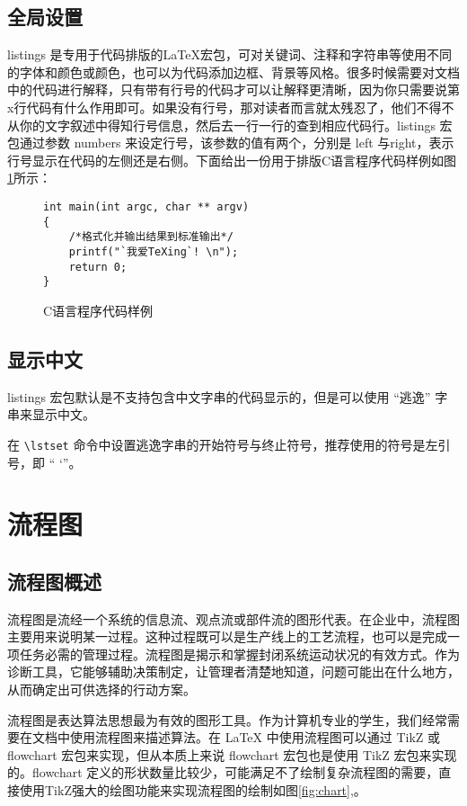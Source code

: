 \subsection{全局设置}
listings 是专用于代码排版的\LaTeX{}宏包，可对关键词、注释和字符串等使用不同的字体和颜色或颜色，也可以为代码添加边框、背景等风格。很多时候需要对文档中的代码进行解释，只有带有行号的代码才可以让解释更清晰，因为你只需要说第 x行代码有什么作用即可。如果没有行号，那对读者而言就太残忍了，他们不得不从你的文字叙述中得知行号信息，然后去一行一行的查到相应代码行。listings 宏包通过参数 numbers 来设定行号，该参数的值有两个，分别是 left 与right，表示行号显示在代码的左侧还是右侧。下面给出一份用于排版C语言程序代码样例如图\ref{fig:code}所示：
\begin{figure}[htb!]
	\centering
	\begin{lstlisting}[language={[ANSI]C}] 
int main(int argc, char ** argv) 
{ 
    /*格式化并输出结果到标准输出*/
    printf("`我爱TeXing`! \n"); 
    return 0; 
} 
	\end{lstlisting} 
	\caption{C语言程序代码样例}
	\label{fig:code}
\end{figure}

\subsection{显示中文}
listings 宏包默认是不支持包含中文字串的代码显示的，但是可以使用 “逃逸” 字串来显示中文。

在 \verb|\lstset| 命令中设置逃逸字串的开始符号与终止符号，推荐使用的符号是左引号，即 “ `”。

\section{流程图}

\subsection{流程图概述}

流程图是流经一个系统的信息流、观点流或部件流的图形代表。在企业中，流程图主要用来说明某一过程。这种过程既可以是生产线上的工艺流程，也可以是完成一项任务必需的管理过程。流程图是揭示和掌握封闭系统运动状况的有效方式。作为诊断工具，它能够辅助决策制定，让管理者清楚地知道，问题可能出在什么地方，从而确定出可供选择的行动方案。

流程图是表达算法思想最为有效的图形工具。作为计算机专业的学生，我们经常需要在文档中使用流程图来描述算法。在 LaTeX 中使用流程图可以通过 TikZ 或 flowchart 宏包来实现，但从本质上来说 flowchart 宏包也是使用 TikZ 宏包来实现的。flowchart 定义的形状数量比较少，可能满足不了绘制复杂流程图的需要，直接使用TikZ强大的绘图功能来实现流程图的绘制如图\ref{fig:chart},。

